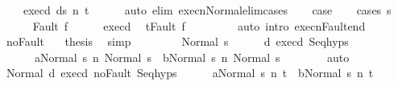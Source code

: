 \begin{isabellebody}
\ \ \ \ exec{\isacharunderscore}d{}{\isacharcolon}\ {\isachardoublequoteopen}{\isasymGamma}{\isasymturnstile}{\isasymlangle}d{}{\isacharcomma}s{\isacharprime}{\isasymrangle}\ {\isacharequal}n{\isasymRightarrow}\ t{\isachardoublequoteclose}\isanewline
\ \ \ \ \isamarkupfalse%
\ {\isacharparenleft}auto\ elim{\isacharcolon}\ execn{\isacharunderscore}Normal{\isacharunderscore}elim{\isacharunderscore}cases{\isacharparenright}\isanewline
\ \ \isamarkupfalse%
\ {\isacharquery}case\isanewline
\ \ \isamarkupfalse%
\ {\isacharparenleft}cases\ s{\isacharprime}{\isacharparenright}\isanewline
\ \ \ \ \isamarkupfalse%
\ {\isacharparenleft}Fault\ f{\isacharprime}{\isacharparenright}\isanewline
\ \ \ \ \isamarkupfalse%
\ exec{\isacharunderscore}d{}\ \isamarkupfalse%
\ {\isachardoublequoteopen}t{\isacharequal}Fault\ f{\isacharprime}{\isachardoublequoteclose}\ \isanewline
\ \ \ \ \ \ \isamarkupfalse%
\ {\isacharparenleft}auto\ intro{\isacharcolon}\ execn{\isacharunderscore}Fault{\isacharunderscore}end{\isacharparenright}\isanewline
\ \ \ \ \isamarkupfalse%
\ noFault\ \isamarkupfalse%
\ \ {\isacharquery}thesis\ \isamarkupfalse%
\ simp\isanewline
\ \ \isamarkupfalse%
\isanewline
\ \ \ \ \isamarkupfalse%
\ {\isacharparenleft}Normal\ s{\isacharprime}{\isacharprime}{\isacharparenright}\isanewline
\ \ \ \ \isamarkupfalse%
\ d{}\ exec{\isacharunderscore}d{}\ Seq{\isachardot}hyps\isanewline
\ \ \ \ \isamarkupfalse%
\ \isanewline
\ \ \ \ \ \ {\isachardoublequoteopen}{\isasymGamma}{\isasymturnstile}{\isasymlangle}a{}{\isacharcomma}Normal\ s{\isasymrangle}\ {\isacharequal}n{\isasymRightarrow}\ Normal\ s{\isacharprime}{\isacharprime}{\isachardoublequoteclose}\ \ {\isachardoublequoteopen}{\isasymGamma}{\isasymturnstile}{\isasymlangle}b{}{\isacharcomma}Normal\ s{\isasymrangle}\ {\isacharequal}n{\isasymRightarrow}\ Normal\ s{\isacharprime}{\isacharprime}{\isachardoublequoteclose}\isanewline
\ \ \ \ \ \ \isamarkupfalse%
\ auto\isanewline
\ \ \ \ \isamarkupfalse%
\isanewline
\ \ \ \ \isamarkupfalse%
\ Normal\ d{}\ exec{\isacharunderscore}d{}\ noFault\ Seq{\isachardot}hyps\isanewline
\ \ \ \ \isamarkupfalse%
\ {\isachardoublequoteopen}{\isasymGamma}{\isasymturnstile}{\isasymlangle}a{}{\isacharcomma}Normal\ s{\isacharprime}{\isacharprime}{\isasymrangle}\ {\isacharequal}n{\isasymRightarrow}\ t{\isachardoublequoteclose}\ \ {\isachardoublequoteopen}{\isasymGamma}{\isasymturnstile}{\isasymlangle}b{}{\isacharcomma}Normal\ s{\isacharprime}{\isacharprime}{\isasymrangle}\ {\isacharequal}n{\isasymRightarrow}\ t{\isachardoublequoteclose}\isanewline

\end{isabellebody}
